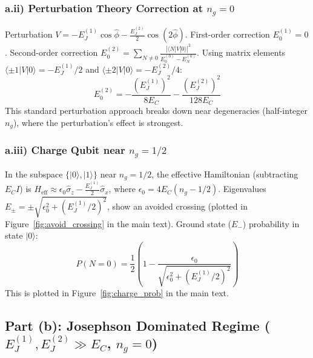 \documentclass[12pt]{article}
\begin{document}
\begin{appendices}
\subsubsection*{a.ii) Perturbation Theory Correction at $n_g=0$}
\label{app:part_a:subsubsec_ii}
Perturbation $V = -E_J^{(1)} \cos \hat{\phi} - \frac{E_J^{(2)}}{2} \cos (2 \hat{\phi})$. First-order correction $E_0^{(1)} = 0$. Second-order correction $E_0^{(2)} = \sum_{N \neq 0} \frac{|\langle N | V | 0 \rangle|^2}{E_0^{(0)} - E_N^{(0)}}$. Using matrix elements $\langle \pm 1 | V | 0 \rangle = -E_J^{(1)}/2$ and $\langle \pm 2 | V | 0 \rangle = -E_J^{(2)}/4$:
\begin{equation}
E_0^{(2)} = -\frac{(E_J^{(1)})^2}{8 E_C} - \frac{(E_J^{(2)})^2}{128 E_C}
\end{equation}
This standard perturbation approach breaks down near degeneracies (half-integer $n_g$), where the perturbation's effect is strongest.

\subsubsection*{a.iii) Charge Qubit near $n_g=1/2$}
\label{app:part_a:subsubsec_iii}
In the subspace $\{|0\rangle, |1\rangle\}$ near $n_g=1/2$, the effective Hamiltonian (subtracting $E_C I$) is $H_{\text{eff}} \approx \epsilon_0 \hat{\sigma}_z - \frac{E_J^{(1)}}{2} \hat{\sigma}_x$, where $\epsilon_0 = 4 E_C (n_g - 1/2)$. Eigenvalues $E_{\pm} = \pm \sqrt{\epsilon_0^2 + (E_J^{(1)}/2)^2}$, show an avoided crossing (plotted in Figure~\ref{fig:avoid_crossing} in the main text). 
Ground state ($E_-$) probability in state $|0\rangle$:
\begin{equation}
P(N=0) = \frac{1}{2} \left( 1 - \frac{\epsilon_0}{\sqrt{\epsilon_0^2 + (E_J^{(1)}/2)^2}} \right) 
\end{equation}
This is plotted in Figure~\ref{fig:charge_prob} in the main text.

\subsection[Part (b): Josephson Dominated Regime]{Part (b): Josephson Dominated Regime ($E_J^{(1)}, E_J^{(2)} \gg E_C$, $n_g=0$)}
\label{app:part_b}


\end{appendices}
\end{document}
